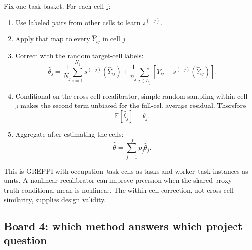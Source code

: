 \documentclass[11pt]{article}
\newcommand{\E}{\mathbb{E}}
\begin{document}
  Fix one task basket. For each cell \(j\):
  \begin{enumerate}[leftmargin=2em]
      \item Use labeled pairs from other cells to learn
      \(s^{(-j)}\).
      \item Apply that map to every \(\widehat Y_{ij}\) in cell \(j\).
      \item Correct with the random target-cell labels:
      \[
          \widehat\theta_j
          =
          \frac{1}{N_j}\sum_{i=1}^{N_j}
          s^{(-j)}(\widehat Y_{ij})
          +
          \frac{1}{n_j}\sum_{i\in L_j}
          \left[
            Y_{ij}-s^{(-j)}(\widehat Y_{ij})
          \right].
      \]
      \item Conditional on the cross-cell recalibrator, simple random sampling
      within cell \(j\) makes the second term unbiased for the full-cell average
      residual. Therefore
      \[
          \E[\widehat\theta_j]=\theta_j.
      \]
      \item Aggregate after estimating the cells:
      \[
          \widehat{\bar\theta}
          =
          \sum_{j=1}^Jp_j\widehat\theta_j.
      \]
  \end{enumerate}
  This is GREPPI with occupation--task cells as tasks and worker--task instances
  as units. A nonlinear recalibrator can improve precision when the shared
  proxy--truth conditional mean is nonlinear. The within-cell correction, not
  cross-cell similarity, supplies design validity.
  
  \subsection*{Board 4: which method answers which project question}
  
\end{document}
